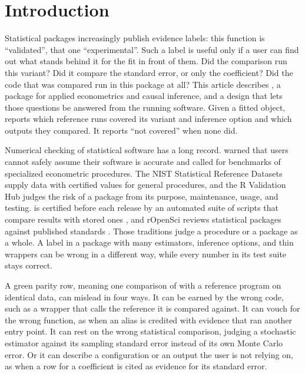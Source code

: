 \section{Introduction}\label{sec:intro}

Statistical packages increasingly publish evidence labels: this function
is ``validated'', that one ``experimental''. Such a label is useful only
if a user can find out what stands behind it for the fit in front of
them. Did the comparison run this variant? Did it compare the standard
error, or only the coefficient? Did the code that was compared run in
this package at all? This article describes \statspai{}, a
 package for applied econometrics and causal inference,
and a design that lets those questions be answered from the running
software. Given a fitted object,  reports
which reference runs covered its variant and inference option and which
outputs they compared. It reports ``not covered'' when none did.

Numerical checking of statistical software has a long record.
\citet{mccullough1999numerical} warned that users cannot safely assume
their software is accurate and called for benchmarks of specialized
econometric procedures. The NIST Statistical Reference Datasets
\citep{filliben1999strd} supply data with certified values for general
procedures, and the R Validation Hub \citep{nicholls2020riskbased} judges
the risk of a package from its purpose, maintenance, usage, and testing.
 is certified before each release by an automated suite of
scripts that compare results with stored ones \citep{gould2001statistical},
and rOpenSci reviews statistical packages against published standards
\citep{padgham2021statistical}.
Those traditions judge a procedure or a package as a whole. A label in a
package with many estimators, inference options, and thin wrappers can be
wrong in a different way, while every number in its test suite stays
correct.

A green parity row, meaning one comparison of \statspai{} with a
reference program on identical data, can mislead in four ways. It can be
earned by the wrong code, such as a  wrapper that calls
the  reference it is compared against. It can vouch for the
wrong function, as when an alias is credited with evidence that ran
another entry point. It can rest on the wrong statistical comparison,
judging a stochastic estimator against its sampling standard error
instead of its own Monte Carlo error. Or it can describe a configuration
or an output the user is not relying on, as when a row for a coefficient
is cited as evidence for its standard error.

